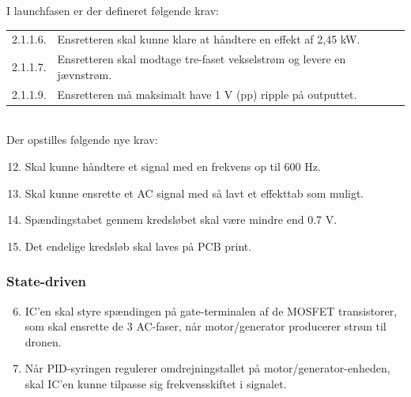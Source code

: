 I launchfasen er der defineret følgende krav:\\

\vspace{1em}
\begin{tabular}[h]{ll}
  2.1.1.6. &Ensretteren skal kunne klare at håndtere en effekt af 2,45 kW.\vspace{0.5em}\\
  2.1.1.7. &Ensretteren skal modtage tre-faset vekselstrøm og levere en jævnstrøm.\vspace{0.5em}\\%
  2.1.1.9. &Ensretteren må maksimalt have 1 V (pp) ripple på outputtet.\vspace{0.5em}\\
\end{tabular}
\vspace{1em}\\

Der opstilles følgende nye krav:
\begin{enumerate}[label=2.1.1.\arabic*]
  \setcounter{enumi}{11}
\item Skal kunne håndtere et signal med en frekvens op til 600 Hz.
\item Skal kunne ensrette et AC signal med så lavt et effekttab som muligt.
\item Spændingstabet gennem kredsløbet skal være mindre end 0.7 V.
\item Det endelige kredsløb skal laves på PCB print.
\end{enumerate}


\subsubsection{State-driven}
\label{sec:state-driven}
\begin{enumerate}[label=2.1.3.\arabic*]
  \setcounter{enumi}{5}
\item IC’en skal styre spændingen på gate-terminalen af de MOSFET transistorer, som skal ensrette de 3 AC-faser, når motor/generator producerer strøm til dronen.
\item Når PID-syringen regulerer omdrejningstallet på motor/generator-enheden, skal IC’en kunne tilpasse sig frekvensskiftet i signalet.
\end{enumerate}



